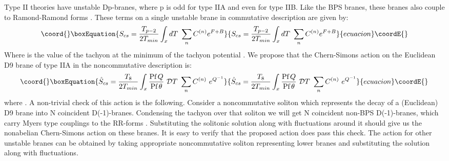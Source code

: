 \documentclass[a4paper,a4paper]{amsproc}
\theoremstyle{definition}
\theoremstyle{remark}
\numberwithin{equation}{section}
\begin{document}
Type II theories have unstable Dp-branes, where p is odd for type IIA
and even for type IIB. Like the BPS branes, these branes also couple
to Ramond-Ramond forms \cite{sencs, billo, kennedy}. These terms on a
single unstable brane in commutative description are given by:
%
\begin{equation}\coord{}\boxEquation{
S_{cs} = {\frac{T_{p-2}}{2T_{min}}}\int_x 
dT~\sum_n C^{(n)} e^{F+B}
}{
S_{cs} = {\frac{T_{p-2}}{2T_{min}}}\int_x 
dT~\sum_n C^{(n)} e^{F+B}
}{ecuacion}\coordE{}\end{equation}
%
Where \coordHE{} is the value of the tachyon at the minimum of the
tachyon potential \coordHE{}. We propose that the Chern-Simons action on
the Euclidean D9 brane of type IIA in the noncommutative description
is:
%
\begin{equation}\coord{}\boxEquation{
\hat{S}_{cs} = \frac{T_{8}}{2T_{min}}\int_x \frac{\hbox{Pf}\,
Q}{\hbox{Pf}\, \theta} ~{\mathcal{D}}T~ \sum_n C^{(n)}~e^{Q^{-1}}
}{
\hat{S}_{cs} = \frac{T_{8}}{2T_{min}}\int_x \frac{\hbox{Pf}\,
Q}{\hbox{Pf}\, \theta} ~{\mathcal{D}}T~ \sum_n C^{(n)}~e^{Q^{-1}}
}{ecuacion}\coordE{}\end{equation}
%
where \coordHE{}. A non-trivial
check of this action is the following. Consider a noncommutative
soliton which represents the decay of a (Euclidean) D9 brane into N
coincident D(-1)-branes. Condensing the tachyon over that soliton we
will get N coincident non-BPS D(-1)-branes, which carry Myers type
couplings to the RR-forms \cite{twosens}. Substituting the solitonic
solution along with fluctuations around it should give us the
nonabelian Chern-Simons action on these branes. It is easy to verify
that the proposed action does pass this check. The action for other
unstable branes can be obtained by taking appropriate noncommutative
soliton representing lower branes and substituting the solution along
with fluctuations.
\end{document}
